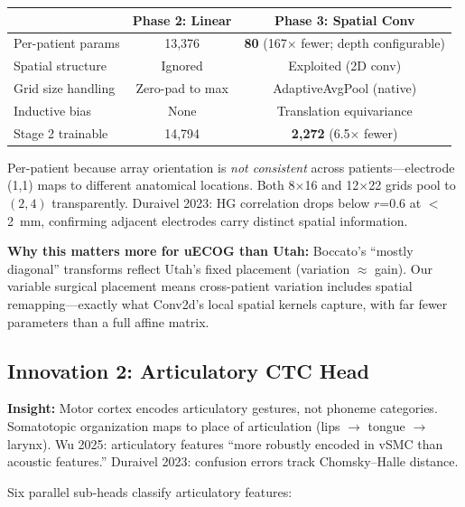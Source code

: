 \documentclass[11pt, letterpaper]{article}
\begin{document}
\begin{table}[h]
\centering\small
\begin{tabular}{@{}lcc@{}}
\toprule
& \textbf{Phase 2: Linear} & \textbf{Phase 3: Spatial Conv} \\
\midrule
Per-patient params & 13{,}376 & \textbf{80} (167$\times$ fewer; depth configurable) \\
Spatial structure & Ignored & Exploited (2D conv) \\
Grid size handling & Zero-pad to max & AdaptiveAvgPool (native) \\
Inductive bias & None & Translation equivariance \\
Stage 2 trainable & 14{,}794 & \textbf{2{,}272} (6.5$\times$ fewer) \\
\bottomrule
\end{tabular}
\end{table}

Per-patient because array orientation is \emph{not consistent} across patients---electrode (1,1) maps to different anatomical locations. Both 8$\times$16 and 12$\times$22 grids pool to $(2,4)$ transparently. Duraivel 2023: HG correlation drops below $r$=0.6 at $<$2~mm, confirming adjacent electrodes carry distinct spatial information.

\textbf{Why this matters more for uECOG than Utah:} Boccato's ``mostly diagonal'' transforms reflect Utah's fixed placement (variation $\approx$ gain). Our variable surgical placement means cross-patient variation includes spatial remapping---exactly what Conv2d's local spatial kernels capture, with far fewer parameters than a full affine matrix.

\subsection{Innovation 2: Articulatory CTC Head}

\textbf{Insight:} Motor cortex encodes articulatory gestures, not phoneme categories. Somatotopic organization maps to place of articulation (lips $\to$ tongue $\to$ larynx). Wu 2025: articulatory features ``more robustly encoded in vSMC than acoustic features.'' Duraivel 2023: confusion errors track Chomsky--Halle distance.

Six parallel sub-heads classify articulatory features:
\end{document}
